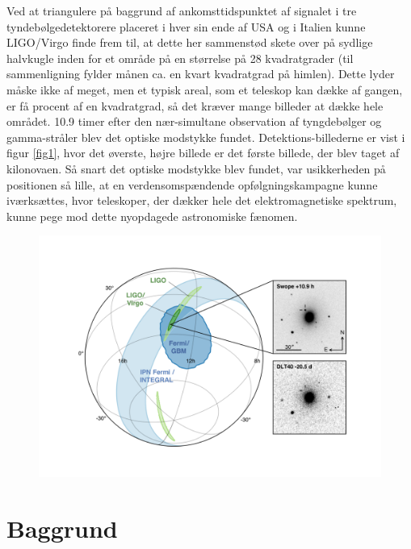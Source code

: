 \documentclass[twocolumn]{article}
\begin{document}
Ved at triangulere på baggrund af ankomsttidspunktet af signalet i tre tyndebølgedetektorere placeret i hver sin ende af USA og i Italien kunne LIGO/Virgo finde frem til, at dette her sammenstød skete over på sydlige halvkugle inden for et område på en størrelse på 28 kvadratgrader (til sammenligning fylder månen ca. en kvart kvadratgrad på himlen). Dette lyder måske ikke af meget, men et typisk areal, som et teleskop kan dække af gangen, er få procent af en kvadratgrad, så det kræver mange billeder at dække hele området. 10.9 timer efter den nær-simultane observation af tyngdebølger og gamma-stråler blev det optiske modstykke fundet. Detektions-billederne er vist i figur \ref{fig1}, hvor det øverste, højre billede er det første billede, der blev taget af kilonovaen. Så snart det optiske modstykke blev fundet, var usikkerheden på positionen så lille, at en verdensomspændende opfølgningskampagne kunne iværksættes, hvor teleskoper, der dækker hele det elektromagnetiske spektrum, kunne pege mod dette nyopdagede astronomiske fænomen.

\begin{figure}
\includegraphics[width=\columnwidth]{GW170817_MMA_Skymap}
\end{figure}





\section{Baggrund}\label{bag}
\end{document}
